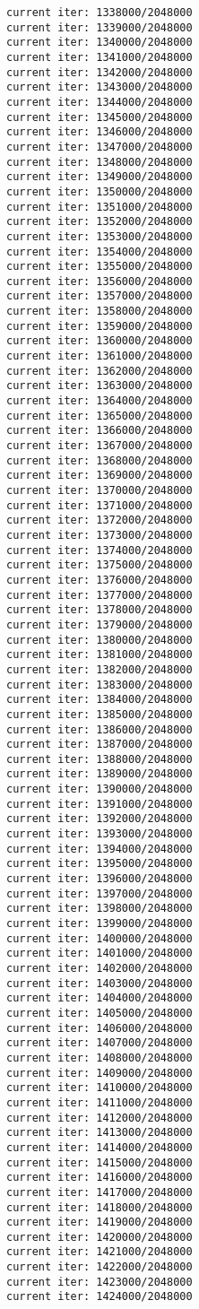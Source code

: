 \documentclass[11pt]{article}
\begin{document}
\begin{Verbatim}[commandchars=\\\{\}]
current iter: 1338000/2048000
current iter: 1339000/2048000
current iter: 1340000/2048000
current iter: 1341000/2048000
current iter: 1342000/2048000
current iter: 1343000/2048000
current iter: 1344000/2048000
current iter: 1345000/2048000
current iter: 1346000/2048000
current iter: 1347000/2048000
current iter: 1348000/2048000
current iter: 1349000/2048000
current iter: 1350000/2048000
current iter: 1351000/2048000
current iter: 1352000/2048000
current iter: 1353000/2048000
current iter: 1354000/2048000
current iter: 1355000/2048000
current iter: 1356000/2048000
current iter: 1357000/2048000
current iter: 1358000/2048000
current iter: 1359000/2048000
current iter: 1360000/2048000
current iter: 1361000/2048000
current iter: 1362000/2048000
current iter: 1363000/2048000
current iter: 1364000/2048000
current iter: 1365000/2048000
current iter: 1366000/2048000
current iter: 1367000/2048000
current iter: 1368000/2048000
current iter: 1369000/2048000
current iter: 1370000/2048000
current iter: 1371000/2048000
current iter: 1372000/2048000
current iter: 1373000/2048000
current iter: 1374000/2048000
current iter: 1375000/2048000
current iter: 1376000/2048000
current iter: 1377000/2048000
current iter: 1378000/2048000
current iter: 1379000/2048000
current iter: 1380000/2048000
current iter: 1381000/2048000
current iter: 1382000/2048000
current iter: 1383000/2048000
current iter: 1384000/2048000
current iter: 1385000/2048000
current iter: 1386000/2048000
current iter: 1387000/2048000
current iter: 1388000/2048000
current iter: 1389000/2048000
current iter: 1390000/2048000
current iter: 1391000/2048000
current iter: 1392000/2048000
current iter: 1393000/2048000
current iter: 1394000/2048000
current iter: 1395000/2048000
current iter: 1396000/2048000
current iter: 1397000/2048000
current iter: 1398000/2048000
current iter: 1399000/2048000
current iter: 1400000/2048000
current iter: 1401000/2048000
current iter: 1402000/2048000
current iter: 1403000/2048000
current iter: 1404000/2048000
current iter: 1405000/2048000
current iter: 1406000/2048000
current iter: 1407000/2048000
current iter: 1408000/2048000
current iter: 1409000/2048000
current iter: 1410000/2048000
current iter: 1411000/2048000
current iter: 1412000/2048000
current iter: 1413000/2048000
current iter: 1414000/2048000
current iter: 1415000/2048000
current iter: 1416000/2048000
current iter: 1417000/2048000
current iter: 1418000/2048000
current iter: 1419000/2048000
current iter: 1420000/2048000
current iter: 1421000/2048000
current iter: 1422000/2048000
current iter: 1423000/2048000
current iter: 1424000/2048000

\end{Verbatim}
\end{document}
